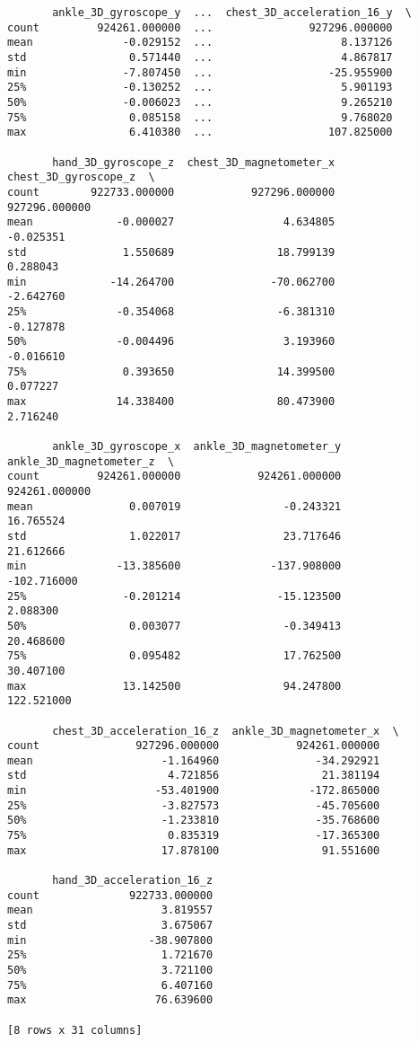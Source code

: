 \documentclass[11pt]{article}
\begin{document}
\begin{verbatim}
       ankle_3D_gyroscope_y  ...  chest_3D_acceleration_16_y  \
count         924261.000000  ...               927296.000000   
mean              -0.029152  ...                    8.137126   
std                0.571440  ...                    4.867817   
min               -7.807450  ...                  -25.955900   
25%               -0.130252  ...                    5.901193   
50%               -0.006023  ...                    9.265210   
75%                0.085158  ...                    9.768020   
max                6.410380  ...                  107.825000   

       hand_3D_gyroscope_z  chest_3D_magnetometer_x  chest_3D_gyroscope_z  \
count        922733.000000            927296.000000         927296.000000   
mean             -0.000027                 4.634805             -0.025351   
std               1.550689                18.799139              0.288043   
min             -14.264700               -70.062700             -2.642760   
25%              -0.354068                -6.381310             -0.127878   
50%              -0.004496                 3.193960             -0.016610   
75%               0.393650                14.399500              0.077227   
max              14.338400                80.473900              2.716240   

       ankle_3D_gyroscope_x  ankle_3D_magnetometer_y  ankle_3D_magnetometer_z  \
count         924261.000000            924261.000000            924261.000000   
mean               0.007019                -0.243321                16.765524   
std                1.022017                23.717646                21.612666   
min              -13.385600              -137.908000              -102.716000   
25%               -0.201214               -15.123500                 2.088300   
50%                0.003077                -0.349413                20.468600   
75%                0.095482                17.762500                30.407100   
max               13.142500                94.247800               122.521000   

       chest_3D_acceleration_16_z  ankle_3D_magnetometer_x  \
count               927296.000000            924261.000000   
mean                    -1.164960               -34.292921   
std                      4.721856                21.381194   
min                    -53.401900              -172.865000   
25%                     -3.827573               -45.705600   
50%                     -1.233810               -35.768600   
75%                      0.835319               -17.365300   
max                     17.878100                91.551600   

       hand_3D_acceleration_16_z  
count              922733.000000  
mean                    3.819557  
std                     3.675067  
min                   -38.907800  
25%                     1.721670  
50%                     3.721100  
75%                     6.407160  
max                    76.639600  

[8 rows x 31 columns]
    \end{verbatim}
\end{document}
